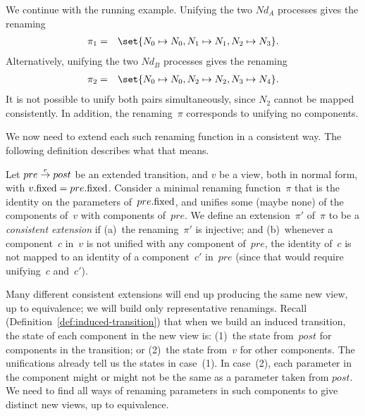 \begin{example}
We continue with the running example.  Unifying the two $Nd_A$ processes
gives the renaming
\begin{eqnarray*}
\pi_1 & = & \set{N_0 \mapsto N_0, N_1 \mapsto N_1, N_2 \mapsto N_3}.
\end{eqnarray*}
Alternatively, unifying the two $Nd_B$ processes gives the renaming
\begin{eqnarray*}
\pi_2 & = & \set{N_0 \mapsto N_0, N_2 \mapsto N_2, N_3 \mapsto N_4}.
\end{eqnarray*}
It is not possible to unify both pairs simultaneously, since $N_2$ cannot be
mapped consistently.
In addition, the renaming~$\pi$ corresponds to unifying no components.
\end{example}

We now need to extend each such renaming function in a consistent way.  The
following definition describes what that means.
%
\begin{definition}
\label{def:consistent-extension}
Let $pre \stackrel{e}\rightarrow post$ be an extended transition, and $v$ be a view, both in
normal form, with $v.\mathrm{fixed} = pre.\mathrm{fixed}$.
%
Consider a minimal renaming function~$\pi$ that is the identity on the
parameters of~$pre.\mathrm{fixed}$, and unifies some (maybe none) of the components
of~$v$ with components of~$pre$.  We define an extension~$\pi'$ of~$\pi$ to be
a \emph{consistent extension} if (a)~the renaming~$\pi'$ is injective; and
(b)~whenever a component~$c$ in~$v$ is not unified with any component
of~$pre$, the identity of~$c$ is not mapped to an identity of a component~$c'$
in~$pre$ (since that would require unifying~$c$ and~$c'$).
\end{definition}


Many different consistent extensions will end up producing the same new view,
up to equivalence; we will build only representative renamings.  Recall
(Definition~\ref{def:induced-transition}) that when we build an induced
transition, the state of each component in the new view is: (1)~the state
from~$post$ for components in the transition; or (2)~the state from~$v$ for
other components.  The unifications already tell us the states in case~(1).
In case~(2), each parameter in the component might or might not be the same as
a parameter taken from $post$.  We need to find all ways of renaming
parameters in such components to give distinct new views, up to equivalence.

